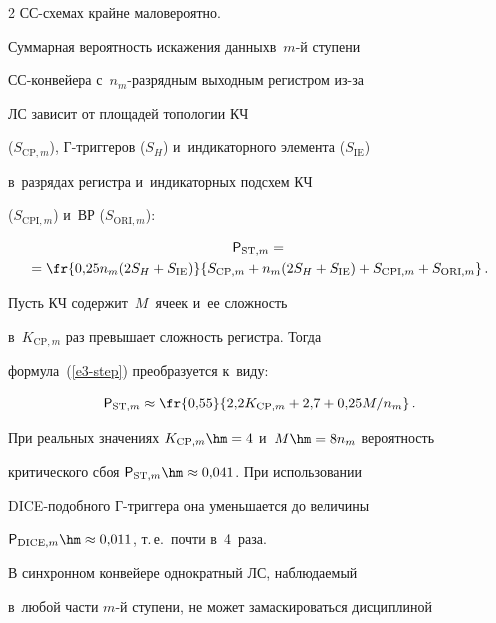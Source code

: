 \begin{multicols}{2}
СС-схе\-мах крайне маловероятно.

  



  

  Суммарная вероятность искажения данных\linebreak в~$m$-й ступени  

СС-кон\-вей\-ера с~$n_m$-раз\-ряд\-ным выходным регистром из-за 

ЛС зависит от площадей топологии КЧ

($S_{\mathrm{CP},m}$), Г-триг\-ге\-ров ($S_H$) и~индикаторного элемента ($S_{\mathrm{IE}}$) 

в~разрядах регистра и~индикаторных подсхем КЧ

($S_{\mathrm{CPI},m}$) и~ВР ($S_{\mathrm{ORI},m}$):

  \begin{multline}

  {\sf P}_{\mathrm{ST},m} ={}\\

  \!\!\!{}=\fr{0{,}25 n_m (2S_H+S_{\mathrm{IE}})}{S_{\mathrm{CP},m} +n_m(2S_H+S_{\mathrm{IE}}) 

+S_{\mathrm{CPI},m} +S_{\mathrm{ORI},m}}\,.\!

  \label{e3-step}

  \end{multline}

  

  Пусть КЧ содержит~$M$~ячеек и~ее сложность 

в~$K_{\mathrm{CP},m}$ раз превышает сложность регистра. Тогда  

формула~(\ref{e3-step}) преобразуется к~виду:

  $$

  {\sf P}_{\mathrm{ST},m} \approx \fr{0{,}55}{2{,}2 K_{\mathrm{CP},m}+2{,}7+ 0{,}25M/n_m}\,.

  $$

При реальных значениях $K_{\mathrm{CP},m}\hm = 4$ и~$M\hm = 8n_m$ вероятность 

критического сбоя ${\sf P}_{\mathrm{ST},m}\hm\approx 0{,}041$. При использовании  

DICE-по\-доб\-но\-го Г-триг\-ге\-ра она уменьшается до величины 

${\sf P}_{\mathrm{DICE},m}\hm\approx 0{,}011$, т.\,е.\ почти в~4~раза.



  В синхронном конвейере однократный ЛС, наблюдаемый 

в~любой части $m$-й ступени, не может замаскироваться дисциплиной 


\end{multicols}
